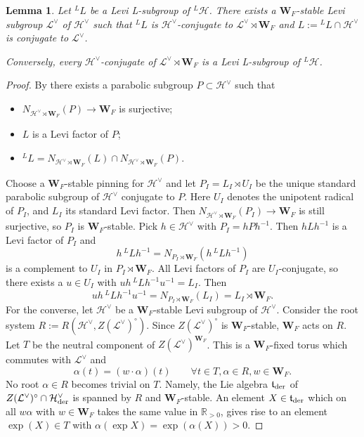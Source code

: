 \documentclass[11pt]{amsart}
\newtheorem{lem}[thm]{Lemma}
\theoremstyle{definition}
\newcommand{\mb}{\mathbf}
\newcommand{\mf}{\mathfrak}
\newcommand{\R}{\mathbb R}
\def\cL{{\mathcal L}}
\def\cH{{\mathcal H}}
\def\der{{\rm der}}
\begin{document}
\begin{lem}\label{lem:7.4}
Let ${}^L L$ be a Levi L-subgroup of ${}^L \cH$.
There exists a $\mb W_F$-stable Levi subgroup $\cL^\vee$ of $\cH^\vee$ such that 
${}^L L$ is $\cH^\vee$-conjugate to $\cL^\vee \rtimes \mb W_F$
and $L := {}^L L \cap \cH^\vee$ is conjugate to $\cL^\vee$. 

Conversely, every $\cH^\vee$-conjugate of $\cL^\vee \rtimes \mb W_F$ is a Levi 
L-subgroup of ${}^L \cH$.
\end{lem}
\begin{proof}
By \cite[Lemma 3.5]{Bor} there exists a parabolic subgroup $P \subset \cH^\vee$
such that 
\begin{itemize}
\item $N_{\cH^\vee \rtimes \mb W_F}(P) \to \mb W_F$ is surjective;
\item $L$ is a Levi factor of $P$;
\item ${}^L L = N_{\cH^\vee \rtimes \mb W_F}(L) \cap N_{\cH^\vee \rtimes \mb W_F}(P)$.
\end{itemize}
Choose a $\mb W_F$-stable pinning for $\cH^\vee$ and let $P_I = L_I \rtimes U_I$
be the unique standard parabolic subgroup of $\cH^\vee$ conjugate to $P$. Here
$U_I$ denotes the unipotent radical of $P_I$, and $L_I$ its standard Levi factor.
Then $N_{\cH^\vee \rtimes \mb W_F}(P_I) \to \mb W_F$ is still surjective, so
$P_I$ is $\mb W_F$-stable. Pick $h \in \cH^\vee$ with $P_I = h P h^{-1}$. Then
$h L h^{-1}$ is a Levi factor of $P_I$ and
\[
h \, {}^L L h^{-1} = N_{P_I \rtimes \mb W_F}(h \, {}^L L h^{-1}) 
\]
is a complement to $U_I$ in $P_I \rtimes \mb W_F$. All Levi factors of $P_I$ are
$U_I$-conjugate, so there exists a $u \in U_I$ with 
$u h \, {}^L L h^{-1} u^{-1} = L_I$. Then
\[
u h \, {}^L L h^{-1} u^{-1} = N_{P_I \rtimes \mb W_F}(L_I) = 
L_I \rtimes \mb W_F .
\]
For the converse, let $\cH^\vee$ be a $\mb W_F$-stable Levi subgroup of $\cH^\vee$.
Consider the root system $R := R (\cH^\vee,Z (\cL^\vee)^\circ )$. Since
$Z (\cL^\vee)^\circ$ is $\mb W_F$-stable, $\mb W_F$ acts on $R$. Let $T$ be the 
neutral component of $Z( \cL^\vee)^{\mb W_F}$. This is a $\mb W_F$-fixed torus 
which commutes with $\cL^\vee$ and
\[
\alpha (t) = (w \cdot \alpha)(t) \qquad \forall t \in T, \alpha \in R, w \in \mb W_F. 
\]
No root $\alpha \in R$ becomes trivial on $T$. Namely, the Lie algebra $\mf t_\der$ of 
$Z(\cL^\vee)^\circ \cap \cH^\vee_\der$ is spanned by $R$ and $\mb W_F$-stable. An element
$X \in \mf t_\der$ which on all $w \alpha$ with $w \in \mb W_F$ takes the same value
in $\R_{>0}$, gives rise to an element $\exp (X) \in T$ with $\alpha (\exp X) =
\exp (\alpha (X)) > 0$. 


\end{proof}
\end{document}
